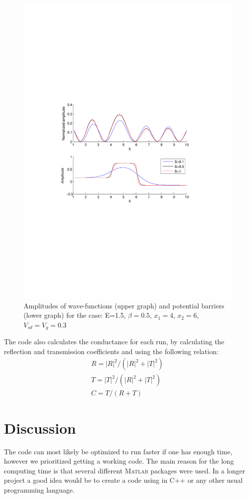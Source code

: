 \documentclass[a4paper]{article}
\begin{document}
\begin{figure}[h!]
\centering
\includegraphics[width=4.5in]{test3}
\caption{Amplitudes of wave-functions (upper graph) and potential barriers (lower graph) for the case: E=1.5, $\beta=0.5$, $x_1=4$, $x_2=6$, $V_{sd}=V_g=0.3$}
\label{fig:test3}
\end{figure}

The code also calculates the conductance for each run, by calculating the reflection and transmission coefficients and using the following relation:
\begin{eqnarray*}
R=|R|^2/(|R|^2+|T|^2)\\
T=|T|^2/(|R|^2+|T|^2)\\
C = T/(R+T)
\end{eqnarray*}

\section{Discussion}


The code can most likely be optimized to run faster if one has enough time, however we prioritized getting a working code. The main reason for the long computing time is that several different \textsc{Matlab} packages were used. In a longer project a good idea would be to create a code using in C++ or any other usual programming language.
\end{document}
